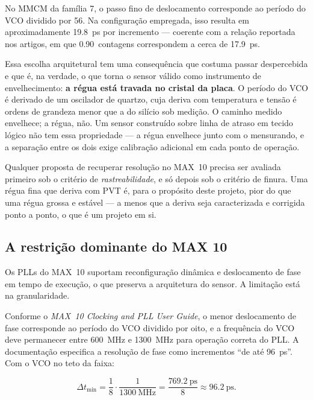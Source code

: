 \documentclass[11pt,a4paper]{article}
\begin{document}
No MMCM da família 7, o passo fino de deslocamento corresponde ao período do VCO
dividido por 56. Na configuração empregada, isso resulta em aproximadamente
\SI{19.8}{\pico\second} por incremento --- coerente com a relação reportada nos
artigos, em que \SI{0.90}{contagens} correspondem a cerca de \SI{17.9}{\pico\second}.

Essa escolha arquitetural tem uma consequência que costuma passar despercebida e que
é, na verdade, o que torna o sensor válido como instrumento de envelhecimento:
\textbf{a régua está travada no cristal da placa}. O período do VCO é derivado de um
oscilador de quartzo, cuja deriva com temperatura e tensão é ordens de grandeza menor
que a do silício sob medição. O caminho medido envelhece; a régua, não. Um sensor
construído sobre linha de atraso em tecido lógico não tem essa propriedade --- a régua
envelhece junto com o mensurando, e a separação entre os dois exige calibração adicional
em cada ponto de operação.

\begin{keybox}[title={Consequência para o desenho da equipe}]
Qualquer proposta de recuperar resolução no MAX~10 precisa ser avaliada primeiro sob
o critério de \emph{rastreabilidade}, e só depois sob o critério de finura. Uma régua
fina que deriva com PVT é, para o propósito deste projeto, pior do que uma régua grossa
e estável --- a menos que a deriva seja caracterizada e corrigida ponto a ponto,
o que é um projeto em si.
\end{keybox}

\subsection{A restrição dominante do MAX 10}

Os PLLs do MAX~10 suportam reconfiguração dinâmica e deslocamento de fase em tempo de
execução, o que preserva a arquitetura do sensor. A limitação está na granularidade.

Conforme o \emph{MAX~10 Clocking and PLL User Guide}, o menor deslocamento de fase
corresponde ao período do VCO dividido por oito, e a frequência do VCO deve permanecer
entre \SI{600}{\mega\hertz} e \SI{1300}{\mega\hertz} para operação correta do PLL. A
documentação especifica a resolução de fase como incrementos ``de até
\SI{96}{\pico\second}''. Com o VCO no teto da faixa:

\begin{equation}
\Delta t_\text{min} = \frac{1}{8}\cdot\frac{1}{\SI{1300}{\mega\hertz}}
= \frac{\SI{769.2}{\pico\second}}{8} \approx \SI{96.2}{\pico\second}.
\end{equation}
\end{document}
